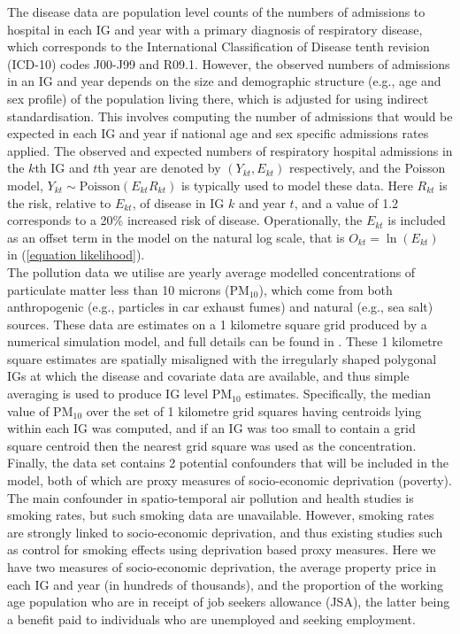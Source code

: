 \documentclass[article, nojss]{jss}
\begin{document}
The disease data are population level counts of the numbers of admissions to hospital in each IG and year with a primary diagnosis of respiratory disease, which corresponds to the International Classification of Disease tenth revision (ICD-10) codes J00-J99 and R09.1. However, the observed numbers of admissions in an IG and year depends on the size and demographic structure (e.g., age and sex profile) of the population living there, which is adjusted for using indirect standardisation. This involves computing the number of admissions that would be expected in each IG and year if national age and sex specific admissions rates applied. The observed and expected numbers of respiratory hospital admissions in the $k$th IG and $t$th year are denoted by $(Y_{kt}, E_{kt})$ respectively, and the Poisson model, $Y_{kt}\sim\mbox{Poisson}(E_{kt}R_{kt})$ is typically used to model these data. Here $R_{kt}$ is the risk, relative to $E_{kt}$, of disease in IG $k$ and year $t$, and a value of 1.2 corresponds to a 20\% increased risk of disease. Operationally, the $E_{kt}$ is included as an offset term in the model on the natural log scale, that is $O_{kt}=\ln(E_{kt})$ in (\ref{equation likelihood}).\\ 

The pollution data we utilise are yearly average modelled concentrations of particulate matter less than 10 microns (PM$_{10}$), which come from both anthropogenic (e.g., particles in car exhaust fumes) and natural (e.g., sea salt) sources. These data are estimates on a 1 kilometre square grid produced by a numerical simulation model, and full details can be found in \cite{ricardo2015}. These 1 kilometre square estimates are spatially misaligned with the irregularly shaped polygonal IGs at which the disease and covariate data are available, and thus simple averaging is used to produce IG level PM$_{10}$ estimates. Specifically, the median value of PM$_{10}$ over the set of 1 kilometre grid squares having centroids lying within each IG was computed, and if an IG was too small to contain a grid square centroid then the nearest grid square was used as the concentration.\\

Finally, the data set contains 2 potential confounders that will be included in the model, both of which are proxy measures of socio-economic deprivation (poverty). The main confounder in spatio-temporal air pollution and health studies is smoking rates, but such smoking data are unavailable. However, smoking rates are strongly linked to socio-economic deprivation, and thus existing studies such as \cite{haining2010} control for smoking effects using deprivation based proxy measures. Here we have two measures of socio-economic deprivation, the average property price in each IG and year (in hundreds of thousands), and the proportion of the working age population who are in receipt of job seekers allowance (JSA), the latter being a benefit paid to individuals who are unemployed and seeking employment.\\
\end{document}
